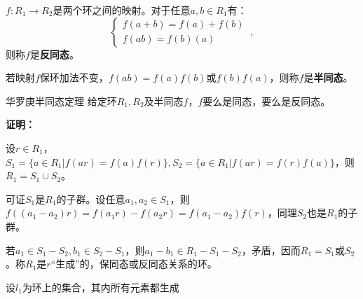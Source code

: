 
\begin{definition}{}
$f:R_1\rightarrow R_2$是两个环之间的映射。对于任意$a,b\in R_1$有：
\begin{equation}
\left\{\begin{array}{c}
f(a+b)=f(a)+f(b) \\
f(a b)=f(b) (a)
\end{array}\right.
~,\end{equation}
则称$f$是\textbf{反同态}。

若映射$f$保环加法不变，$f(ab)=f(a)f(b)$或$f(b)f(a)$，则称$f$是\textbf{半同态}。
\end{definition}
\begin{theorem}{华罗庚半同态定理}
给定环$R_1,R_2$及半同态$f$，$f$要么是同态，要么是反同态。
\end{theorem}
\textbf{证明：}

设$r\in R_1$，$S_1=\{a\in R_1|f(ar)=f(a)f(r)\},S_2=\{a\in R_1|f(ar)=f(r)f(a)\}$，则$R_1=S_1\cup S_2$。

可证$S_1$是$R_1$的子群。设任意$a_1,a_2\in S_1$，则$f((a_1-a_2)r)=f(a_1r)-f(a_2r)=f(a_1-a_2)f(r)$，同理$S_2$也是$R_1$的子群。

若$a_1\in S_1-S_2,b_1\in S_2-S_1$，则$a_1-b_1\in R_1-S_1-S_2$，矛盾，因而$R_1=S_1$或$S_2$。称$R_1$是$r$“生成”的，保同态或反同态关系的环。

设$l_1$为环上的集合，其内所有元素都生成

